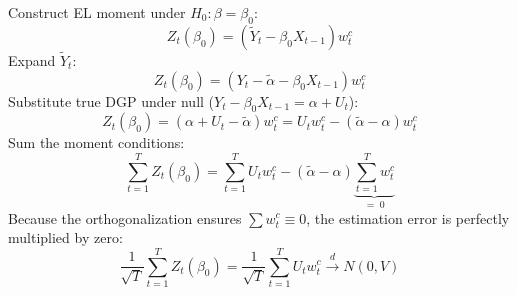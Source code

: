 \documentclass[11pt,landscape]{article}
\begin{document}
\noindent
\begin{minipage}[t]{0.48\textwidth}
Construct EL moment under $H_0: \beta = \beta_0$:
\begin{equation}
    Z_t(\beta_0) = \left( \widetilde{Y}_t - \beta_0 X_{t-1} \right) w^c_t
\end{equation}
Expand $\widetilde{Y}_t$:
\begin{equation}
    Z_t(\beta_0) = \left( Y_t - \widetilde{\alpha} - \beta_0 X_{t-1} \right) w^c_t
\end{equation}
Substitute true DGP under null ($Y_t - \beta_0 X_{t-1} = \alpha + U_t$):
\begin{equation}
    Z_t(\beta_0) = \left( \alpha + U_t - \widetilde{\alpha} \right) w^c_t = U_t w^c_t - (\widetilde{\alpha} - \alpha) w^c_t
\end{equation}
Sum the moment conditions:
\begin{equation}
    \sum_{t=1}^T Z_t(\beta_0) = \sum_{t=1}^T U_t w^c_t - (\widetilde{\alpha} - \alpha) \underbrace{\sum_{t=1}^T w^c_t}_{=\; 0}
\end{equation}
Because the orthogonalization ensures $\sum w^c_t \equiv 0$, the estimation error is perfectly multiplied by zero:
\begin{equation}
    \frac{1}{\sqrt{T}}\sum_{t=1}^T Z_t(\beta_0) = \frac{1}{\sqrt{T}}\sum_{t=1}^T U_t w^c_t \xrightarrow{d} N(0, V)
\end{equation}
\end{minipage}%
\hfill
\end{document}
